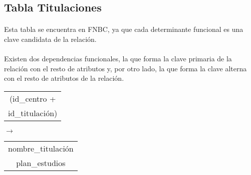 \subsection{Tabla Titulaciones}

  \paragraph{}Esta tabla se encuentra en FNBC, ya que cada determinante
  funcional es una clave candidata de la relación.

  \paragraph{}Existen dos dependencias funcionales, la que forma la clave
  primaria de la relación con el resto de atributos y, por otro lado, la que
  forma la clave alterna con el resto de atributos de la relación.

 \begin{center}
    \begin{minipage}{4.2cm}{\begin{flushright}\begin{tabular}{ | c | }
                  \hline
                  (id\_centro + \\
                  id\_titulación) \\
                  \hline
                 \end{tabular}\end{flushright} }
    \end{minipage}
    \begin{minipage}{0.7cm}{$\longrightarrow$}
    \end{minipage}
    \begin{minipage}{5.9cm}{\begin{tabular}{ | c | }
                  \hline
                  nombre\_titulación \\
                  plan\_estudios \\
                  \hline
                 \end{tabular} }
    \end{minipage}
  \end{center}

